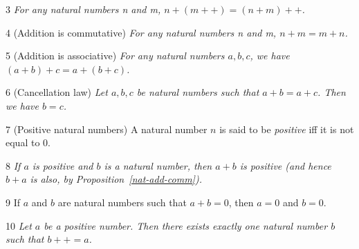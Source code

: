 \begin{lemma}{3}
    \label{nat-add-succ}
    \emph{For any natural numbers n and m, $n+(m++)=(n+m)++$.}
\end{lemma}

\begin{proposition}{4}
    \label{nat-add-comm}
    (Addition is commutative) \emph{For any natural numbers n and m, $n+m=m+n$.}
\end{proposition}

\begin{proposition}{5}
    \label{nat-add-assoc}
    (Addition is associative) \emph{For any natural numbers $a, b, c$, we have $(a+b)+c=a+(b+c)$.}
\end{proposition}

\begin{proposition}{6}
    \label{nat-add-cancel}
    (Cancellation law) \emph{Let $a, b, c$ be natural numbers such that $a+b=a+c$. Then we have $b=c$.}
\end{proposition}

\begin{definition}{7}
    \label{nat-positive}
    (Positive natural numbers) A natural number $n$ is said to be \emph{positive} iff it is not equal to 0.
\end{definition}

\begin{proposition}{8}
    \label{nat-pos-add}
    \emph{If $a$ is positive and $b$ is a natural number, then $a+b$ is positive (and hence $b+a$ is also, by Proposition~\ref{nat-add-comm}).}
\end{proposition}

\begin{corollary}{9}
    \label{nat-add-eq-zero}
    If $a$ and $b$ are natural numbers such that $a+b=0$, then $a=0$ and $b=0$.
\end{corollary}

\begin{lemma}{10}
    \label{nat-pos-predecessor}
    \emph{Let $a$ be a positive number. Then there exists exactly one natural number $b$ such that $b++ = a$.}
\end{lemma}

